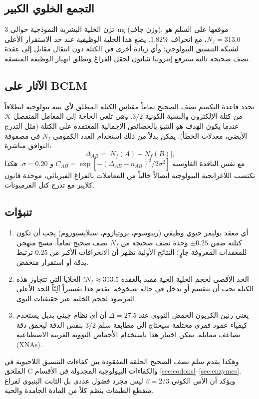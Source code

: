 \documentclass[11pt,a4paper]{article}
\newcommand{\REL}{\mathcal{K}}
\begin{document}
	\subsection{التجمع الخلوي الكبير}
	تزن الخلية البشرية النموذجية حوالي 3~ng (وزن جاف). موقعها على السلم هو \(N_f = 313.0\)، مع انحراف \(1.82\%\). يضع هذا الخلية الوظيفية عند حد الاستقرار الأعلى لشبكة التنسيق البيولوجي؛ وأي زيادة أخرى في الكتلة دون انتقال مقابل إلى عقدة نصف صحيحة تالية سترفع إنتروبيا شانون لحقل الفراغ وتطلق انهيار الوظيفة المنسقة.
	
	\subsection{الآثار على BCLM}
	تحدد قاعدة التكميم نصف الصحيح تماماً مقياس الكتلة المطلق لأي بنية بيولوجية انطلاقاً من كتلة الإلكترون والنسبة الكونية \(3/2\). وهي تلغي الحاجة إلى المعامل المنفصل \(\REL\) عندما يكون الهدف هو التنبؤ بالخصائص الإجمالية المعتمدة على الكتلة (مثل التدرج الأيضي، معدلات الخطأ). يمكن بدلاً من ذلك استخدام العدد الكمومي \(N_f\) في مصفوفة التوافق مباشرة،
	\[
	\Delta_{AB} = |N_f(A) - N_f(B)|,
	\]
	مع نفس النافذة الغاوسية \(C_{AB} = \exp[-(\Delta_{AB} - n_{AB})^2/2\sigma^2]\) و \(\sigma=0.20\). هكذا تكتسب اللاغرانجية البيولوجية اتصالاً خالياً من المعاملات بالفراغ الفيزيائي، موحدة قانون كلايبر مع تدرج كتل الفرميونات.
	
	\subsection{تنبؤات}
	\begin{enumerate}
		\item أي معقد بوليمر حيوي وظيفي (ريبوسوم، بروتيازوم، سبلايسيوزوم) يجب أن تكون كتلته ضمن \(\pm 0.25\) وحدة نصف صحيحة من \(N_f\) نصف صحيح تماماً. مسح منهجي للمعقدات المعروفة جارٍ؛ النتائج الأولية تظهر أن الانحرافات الأكبر من \(0.25\) ترتبط بدقة أو استقرار منخفض.
		\item الحد الأقصى لحجم الخلية الحية مقيد بالعقدة \(N_f \approx 313.5\)؛ الخلايا التي تتجاوز هذه الكتلة يجب أن تنقسم أو تدخل في حالة شيخوخة. يقدم هذا تفسيراً آلِيّاً للحد الأعلى المرصود لحجم الخلية عبر حقيقيات النوى.
		\item يعني رنين الكربون-الحمض النووي عند \(\Delta = 27.5\) أن أي نظام جيني بديل يستخدم كيمياء عمود فقري مختلفة سيحتاج إلى مطابقة سلم \(3/2\) بنفس الدقة ليحقق دقة تضاعف مماثلة. يمكن اختبار هذا باستخدام الأحماض النووية الغريبة الاصطناعية (XNAs).
	\end{enumerate}
	
	وهكذا يقدم سلم نصف الصحيح الحلقة المفقودة بين كفاءات التنسيق اللاحيوية في الملحق C والكفاءات البيولوجية المجدولة في الأقسام \ref{sec:codons}–\ref{sec:enzymes}. ويؤكد أن الأس الكوني \(\beta = 2/3\) ليس مجرد فضول عددي بل الثابت البنيوي لفراغ متقطع الطبقات ينظم كلاً من المادة الجامدة والحية.
	
\end{document}
